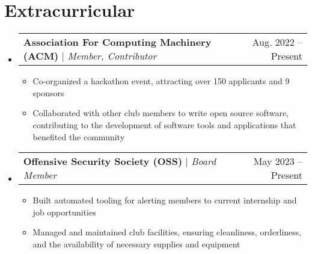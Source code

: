 \documentclass[letterpaper,11pt]{article}
\makeatletter
\newcommand{\resumeItem}[1]{
  \item\small{
    {#1 \vspace{-2pt}}
  }
}
\newcommand{\resumeProjectHeading}[2]{
    \item
    \begin{tabular*}{0.97\textwidth}{l@{\extracolsep{\fill}}r}
      \small#1 & #2 \\
    \end{tabular*}\vspace{-7pt}
}
\newcommand{\resumeSubHeadingListStart}{\begin{itemize}[leftmargin=0.15in, label={}]}
\newcommand{\resumeSubHeadingListEnd}{\end{itemize}}
\newcommand{\resumeItemListStart}{\begin{itemize}}
\newcommand{\resumeItemListEnd}{\end{itemize}\vspace{-5pt}}
\makeatother
\begin{document}
\section{Extracurricular}
    \resumeSubHeadingListStart
      \resumeProjectHeading
          {\textbf{Association For Computing Machinery (ACM) } $|$ \emph{Member, Contributor}}{Aug. 2022 -- Present}
          \resumeItemListStart
            \resumeItem{Co-organized a hackathon event, attracting over 150 applicants and 9 sponsors}
            \resumeItem{Collaborated with other club members to write open source software, contributing to the development of software tools and applications that benefited the community}
          \resumeItemListEnd
     \resumeProjectHeading
      {\textbf{Offensive Security Society (OSS) } $|$ \emph{Board Member}}{May 2023 -- Present}
      \resumeItemListStart
        \resumeItem{Built automated tooling for alerting members to current internship and job opportunities}
        \resumeItem{Managed and maintained club facilities, ensuring cleanliness, orderliness, and the availability of necessary supplies and equipment}
      \resumeItemListEnd
    \resumeSubHeadingListEnd


\end{document}
